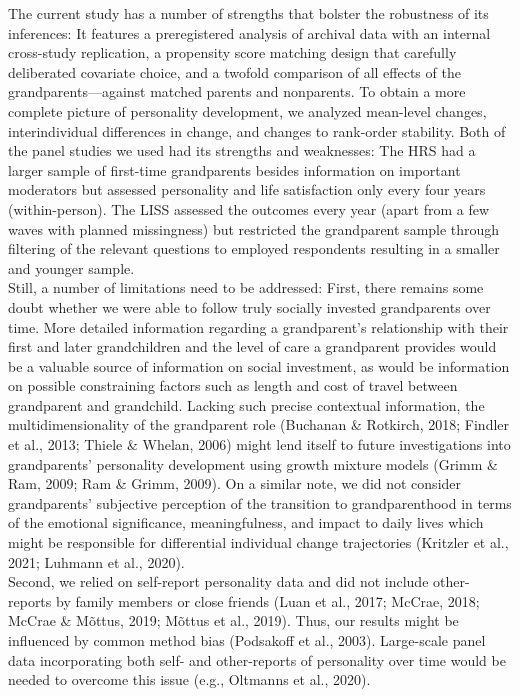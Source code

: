 \documentclass[
  english,
  man, noextraspace]{apa7}
\begin{document}
The current study has a number of strengths that bolster the robustness of its inferences: It features a preregistered analysis of archival data with an internal cross-study replication, a propensity score matching design that carefully deliberated covariate choice, and a twofold comparison of all effects of the grandparents---against matched parents and nonparents. To obtain a more complete picture of personality development, we analyzed mean-level changes, interindividual differences in change, and changes to rank-order stability. Both of the panel studies we used had its strengths and weaknesses: The HRS had a larger sample of first-time grandparents besides information on important moderators but assessed personality and life satisfaction only every four years (within-person). The LISS assessed the outcomes every year (apart from a few waves with planned missingness) but restricted the grandparent sample through filtering of the relevant questions to employed respondents resulting in a smaller and younger sample.\\
Still, a number of limitations need to be addressed: First, there remains some doubt whether we were able to follow truly socially invested grandparents over time. More detailed information regarding a grandparent's relationship with their first and later grandchildren and the level of care a grandparent provides would be a valuable source of information on social investment, as would be information on possible constraining factors such as length and cost of travel between grandparent and grandchild. Lacking such precise contextual information, the multidimensionality of the grandparent role (Buchanan \& Rotkirch, 2018; Findler et al., 2013; Thiele \& Whelan, 2006) might lend itself to future investigations into grandparents' personality development using growth mixture models (Grimm \& Ram, 2009; Ram \& Grimm, 2009). On a similar note, we did not consider grandparents' subjective perception of the transition to grandparenthood in terms of the emotional significance, meaningfulness, and impact to daily lives which might be responsible for differential individual change trajectories (Kritzler et al., 2021; Luhmann et al., 2020).\\
Second, we relied on self-report personality data and did not include other-reports by family members or close friends (Luan et al., 2017; McCrae, 2018; McCrae \& Mõttus, 2019; Mõttus et al., 2019). Thus, our results might be influenced by common method bias (Podsakoff et al., 2003). Large-scale panel data incorporating both self- and other-reports of personality over time would be needed to overcome this issue (e.g., Oltmanns et al., 2020).\\
\end{document}
